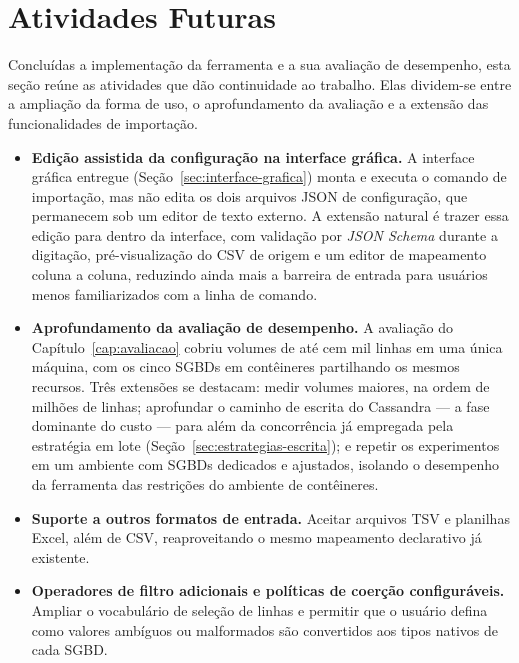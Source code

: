 \chapter{Atividades Futuras}
\label{cap:futuros}

Concluídas a implementação da ferramenta e a sua avaliação de desempenho, esta seção
reúne as atividades que dão continuidade ao trabalho. Elas dividem-se entre a ampliação da
forma de uso, o aprofundamento da avaliação e a extensão das funcionalidades de importação.

\begin{itemize}
  \item \textbf{Edição assistida da configuração na interface gráfica.} A interface
        gráfica entregue (Seção~\ref{sec:interface-grafica}) monta e executa o comando de
        importação, mas não edita os dois arquivos JSON de configuração, que permanecem sob
        um editor de texto externo. A extensão natural é trazer essa edição para dentro da
        interface, com validação por \textit{JSON Schema} durante a digitação,
        pré-visualização do CSV de origem e um editor de mapeamento coluna a coluna,
        reduzindo ainda mais a barreira de entrada para usuários menos familiarizados com
        a linha de comando.

  \item \textbf{Aprofundamento da avaliação de desempenho.} A avaliação do
        Capítulo~\ref{cap:avaliacao} cobriu volumes de até cem mil linhas em uma única
        máquina, com os cinco SGBDs em contêineres partilhando os mesmos recursos. Três
        extensões se destacam: medir volumes maiores, na ordem de milhões de linhas;
        aprofundar o caminho de escrita do Cassandra --- a fase dominante do custo --- para
        além da concorrência já empregada pela estratégia em lote
        (Seção~\ref{sec:estrategias-escrita}); e repetir os experimentos em um ambiente com
        SGBDs dedicados e ajustados, isolando o desempenho da ferramenta das restrições do
        ambiente de contêineres.

  \item \textbf{Suporte a outros formatos de entrada.} Aceitar arquivos TSV e planilhas
        Excel, além de CSV, reaproveitando o mesmo mapeamento declarativo já existente.

  \item \textbf{Operadores de filtro adicionais e políticas de coerção configuráveis.}
        Ampliar o vocabulário de seleção de linhas e permitir que o usuário defina como
        valores ambíguos ou malformados são convertidos aos tipos nativos de cada SGBD.


\end{itemize}
